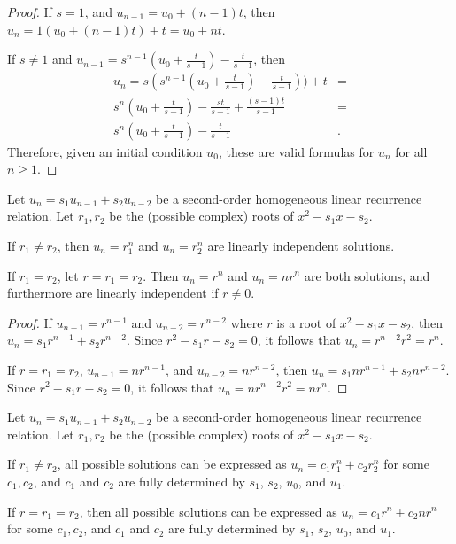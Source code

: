 \begin{proof}\proofbreak
    If $s = 1$, and $u_{n-1} = u_0 + (n-1)t$, then $u_n = 1(u_0 + (n-1)t) + t = u_0 + nt$.

    If $s \neq 1$ and $u_{n-1} = s^{n-1}(u_0 + \frac{t}{s-1}) - \frac{t}{s-1}$, then
    \begin{align*}
        u_n = s(s^{n-1}(u_0 + \frac{t}{s-1}) - \frac{t}{s-1})) + t & = \\
        s^n(u_0 + \frac{t}{s-1}) - \frac{st}{s-1} + \frac{(s-1)t}{s-1} & = \\
        s^n(u_0 + \frac{t}{s-1}) - \frac{t}{s-1} &.
    \end{align*}
    Therefore, given an initial condition $u_0$, these are valid formulas for $u_n$ for all $n \geq 1$.
\end{proof}

\begin{thm}
    Let $u_n = s_1u_{n-1} + s_2u_{n-2}$ be a second-order homogeneous linear recurrence relation. Let $r_1, r_2$ be the (possible complex) roots of $x^2 - s_1x - s_2$.

    If $r_1 \neq r_2$, then $u_n = r_1^n$ and $u_n = r_2^n$ are linearly independent solutions.

    If $r_1 = r_2$, let $r = r_1 = r_2$. Then $u_n = r^n$ and $u_n = nr^n$ are both solutions, and furthermore are linearly independent if $r \neq 0$.
\end{thm}

\begin{proof}\proofbreak
    If $u_{n-1} = r^{n-1}$ and $u_{n-2} = r^{n-2}$ where $r$ is a root of $x^2 - s_1x - s_2$, then $u_n = s_1r^{n-1} + s_2r^{n-2}$. Since $r^2 - s_1r - s_2 = 0$, it follows that $u_n = r^{n-2}r^2 = r^n$.

    If $r = r_1 = r_2$, $u_{n-1} = nr^{n-1}$, and $u_{n-2} = nr^{n-2}$, then $u_n = s_1nr^{n-1} + s_2nr^{n-2}$. Since $r^2 - s_1r - s_2 = 0$, it follows that $u_n = nr^{n-2}r^2 = nr^n$.
\end{proof}

\begin{thm}
    Let $u_n = s_1u_{n-1} + s_2u_{n-2}$ be a second-order homogeneous linear recurrence relation. Let $r_1, r_2$ be the (possible complex) roots of $x^2 - s_1x - s_2$.

    If $r_1 \neq r_2$, all possible solutions can be expressed as $u_n = c_1r_1^n + c_2r_2^n$  for some $c_1, c_2$, and $c_1$ and $c_2$ are fully determined by $s_1$, $s_2$, $u_0$, and $u_1$.

    If $r = r_1 = r_2$, then all possible solutions can be expressed as $u_n = c_1r^n + c_2nr^n$ for some $c_1, c_2$, and $c_1$ and $c_2$ are fully determined by $s_1$, $s_2$, $u_0$, and $u_1$.
\end{thm}

